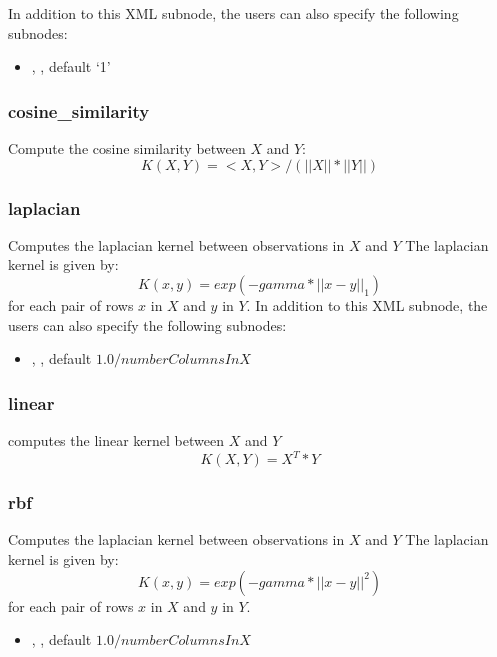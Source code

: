 In addition to this XML subnode, the users can also specify the following subnodes:
\begin{itemize}
  \item {}, , default `1' 
\end{itemize}

\subsubsection{cosine\_similarity}
Compute the cosine similarity between $X$ and $Y$:
\begin{equation}
  K(X, Y) = <X, Y> / (||X||*||Y||)
\end{equation}


\subsubsection{laplacian}
Computes the laplacian kernel between observations in $X$ and $Y$
The laplacian kernel is given by:
\begin{equation}
  K(x, y) = exp(- gamma * ||x - y||_1)
\end{equation}
for each pair of rows $x$ in $X$ and $y$ in $Y$.
In addition to this XML subnode, the users can also specify the following subnodes:
\begin{itemize}
  \item {}, , default $1.0/numberColumnsInX$
\end{itemize}

\subsubsection{linear}
computes the linear kernel between $X$ and $Y$
\begin{equation}
  K(X, Y) = X^T * Y
\end{equation}

\subsubsection{rbf}
Computes the laplacian kernel between observations in $X$ and $Y$
The laplacian kernel is given by:
\begin{equation}
  K(x, y) = exp(- gamma * ||x - y||^2)
\end{equation}
for each pair of rows $x$ in $X$ and $y$ in $Y$.
\begin{itemize}
  \item {}, , default $1.0/numberColumnsInX$
\end{itemize}

